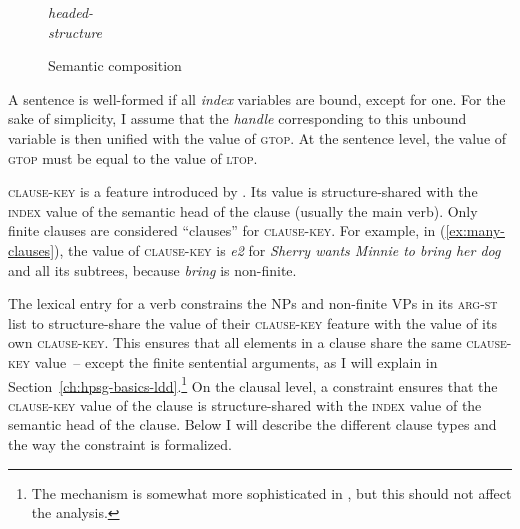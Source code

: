 \vfill
\begin{figure}[H]
\parbox[c]{\widthof{structure}}{\emph{headed-\\structure}} 
\avm{$\Rightarrow$} %
\caption{Semantic composition}\label{fig:new:semantic-composition}
\end{figure}
\vfill
\pagebreak

A sentence is well-formed if all \emph{index} variables are bound, except for one. For the sake of simplicity, I assume that the \emph{handle} corresponding to this unbound variable is then unified with the value of \textsc{gtop}. At the sentence level, the value of \textsc{gtop} must be equal to the value of \textsc{ltop}.

\textsc{clause-key} is a feature introduced by \citet{Song.2017}. Its value is structure-shared with the \textsc{index} value of the semantic head of the clause (usually the main verb). Only finite clauses are considered ``clauses'' for \textsc{clause-key}. For example, in (\ref{ex:many-clauses}), the value of \textsc{clause-key} is \emph{e2} for \emph{Sherry wants Minnie to bring her dog} and all its subtrees, because \emph{bring} is non-finite.

\label{ex:many-clauses}
\z 

The lexical entry for a verb constrains the NPs and non-finite VPs in its \textsc{arg-st} list to structure-share the value of their \textsc{clause-key} feature with the value of its own \textsc{clause-key}. This ensures that all elements in a clause share the same \textsc{clause-key} value~-- except the finite sentential arguments, as I will explain in Section~\ref{ch:hpsg-basics-ldd}.\footnote{The mechanism is somewhat more sophisticated in \citet{Song.2017}, but this should not affect the analysis.} 
On the clausal level, a constraint ensures that the \textsc{clause-key} value  of the clause  is structure-shared with the \textsc{index} value of the semantic head of the clause. Below I will describe the different clause types and the way the constraint is formalized.

